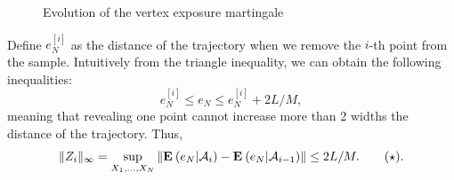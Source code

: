 \begin{figure}[ht]
    \caption{Evolution of the vertex exposure martingale}
\end{figure}

Define $e_N^{[i]}$ as the distance of the trajectory when we remove the $i$-th point from the sample. Intuitively from the triangle inequality, we can obtain the following inequalities:
\[ e_N^{[i]} \leq e_N \leq e_N^{[i]} + 2 L/M, \]
meaning that revealing one point cannot increase more than 2 widths the distance of the trajectory. Thus,
\[ \|Z_i\|_\infty = \sup_{X_1,\ldots, X_N} \|\mathbf{E}\: (e_N | \mathcal{A}_i) - \mathbf{E}\: (e_N | \mathcal{A}_{i-1})\| \leq 2L/M. \tag*{$ (\star)$}.\]

